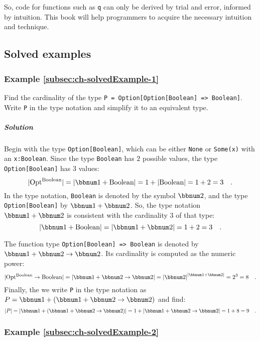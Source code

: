 So, code for functions such as \lstinline!q! can only be derived
by trial and error, informed by intuition. This book will help programmers
to acquire the necessary intuition and technique.

\subsection{Solved examples}

\subsubsection{Example \label{subsec:ch-solvedExample-1}\ref{subsec:ch-solvedExample-1}}

Find the cardinality of the type \lstinline!P = Option[Option[Boolean] => Boolean]!.
Write \lstinline!P! in the type notation and simplify it to an equivalent
type.

\subparagraph{Solution}

Begin with the type \lstinline!Option[Boolean]!, which can be either
\lstinline!None! or \lstinline!Some(x)! with an \lstinline!x:Boolean!.
Since the type \lstinline!Boolean! has $2$ possible values, the
type \lstinline!Option[Boolean]! has $3$ values:
\[
|\text{Opt}^{\text{Boolean}}|=\left|\bbnum 1+\text{Boolean}\right|=1+\left|\text{Boolean}\right|=1+2=3\quad.
\]
In the type notation, \lstinline!Boolean! is denoted by the symbol
$\bbnum 2$, and the type \lstinline!Option[Boolean]! by $\bbnum 1+\bbnum 2$.
So, the type notation $\bbnum 1+\bbnum 2$ is consistent with the
cardinality $3$ of that type:
\[
\left|\bbnum 1+\text{Boolean}\right|=\left|\bbnum 1+\bbnum 2\right|=1+2=3\quad.
\]

The function type \lstinline!Option[Boolean] => Boolean! is denoted
by $\bbnum 1+\bbnum 2\rightarrow\bbnum 2$. Its cardinality is computed
as the numeric power:
\[
|\text{Opt}^{\text{Boolean}}\rightarrow\text{Boolean}|=\left|\bbnum 1+\bbnum 2\rightarrow\bbnum 2\right|=\left|\bbnum 2\right|^{\left|\bbnum 1+\bbnum 2\right|}=2^{3}=8\quad.
\]
Finally, the we write \lstinline!P! in the type notation as $P=\bbnum 1+\left(\bbnum 1+\bbnum 2\rightarrow\bbnum 2\right)$
and find:
\[
\left|P\right|=\left|\bbnum 1+\left(\bbnum 1+\bbnum 2\rightarrow\bbnum 2\right)\right|=1+\left|\bbnum 1+\bbnum 2\rightarrow\bbnum 2\right|=1+8=9\quad.
\]


\subsubsection{Example \label{subsec:ch-solvedExample-2}\ref{subsec:ch-solvedExample-2}}

